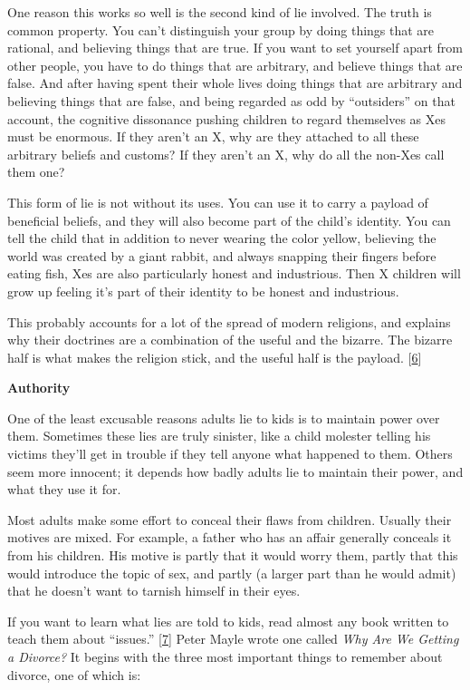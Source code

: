 One reason this works so well is the second kind of lie involved. The
truth is common property. You can't distinguish your group by doing
things that are rational, and believing things that are true. If you
want to set yourself apart from other people, you have to do things that
are arbitrary, and believe things that are false. And after having spent
their whole lives doing things that are arbitrary and believing things
that are false, and being regarded as odd by ``outsiders'' on that
account, the cognitive dissonance pushing children to regard themselves
as Xes must be enormous. If they aren't an X, why are they attached to
all these arbitrary beliefs and customs? If they aren't an X, why do all
the non-Xes call them one?

This form of lie is not without its uses. You can use it to carry a
payload of beneficial beliefs, and they will also become part of the
child's identity. You can tell the child that in addition to never
wearing the color yellow, believing the world was created by a giant
rabbit, and always snapping their fingers before eating fish, Xes are
also particularly honest and industrious. Then X children will grow up
feeling it's part of their identity to be honest and industrious.

This probably accounts for a lot of the spread of modern religions, and
explains why their doctrines are a combination of the useful and the
bizarre. The bizarre half is what makes the religion stick, and the
useful half is the payload. {[}\hyperref[f6n]{6}{]}

\textbf{Authority}

One of the least excusable reasons adults lie to kids is to maintain
power over them. Sometimes these lies are truly sinister, like a child
molester telling his victims they'll get in trouble if they tell anyone
what happened to them. Others seem more innocent; it depends how badly
adults lie to maintain their power, and what they use it for.

Most adults make some effort to conceal their flaws from children.
Usually their motives are mixed. For example, a father who has an affair
generally conceals it from his children. His motive is partly that it
would worry them, partly that this would introduce the topic of sex, and
partly (a larger part than he would admit) that he doesn't want to
tarnish himself in their eyes.

If you want to learn what lies are told to kids, read almost any book
written to teach them about ``issues.'' {[}\hyperref[f7n]{7}{]} Peter
Mayle wrote one called \emph{Why Are We Getting a Divorce?} It begins
with the three most important things to remember about divorce, one of
which is:


